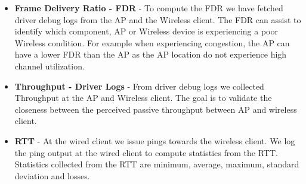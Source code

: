 \begin{itemize}
	\item \textbf{Frame Delivery Ratio - FDR } - To compute the FDR we have fetched driver debug logs from the AP and the Wireless client. The FDR can assist to identify which component, AP or Wireless device is experiencing a poor Wireless condition. For example when experiencing congestion, the AP can have a lower FDR than the AP as the AP location do not experience high channel utilization.
	
	\item \textbf{Throughput - Driver Logs} - From driver debug logs we collected Throughput at the AP and Wireless client. The goal is to validate the closeness between the perceived passive throughput between AP and wireless client.
	
	\item \textbf{RTT} - At the wired client we issue pings towards the wireless client. We log the ping output at the wired client to compute statistics from the RTT. Statistics collected from the RTT are minimum, average, maximum, standard deviation and losses.
	
	
		
\end{itemize}
